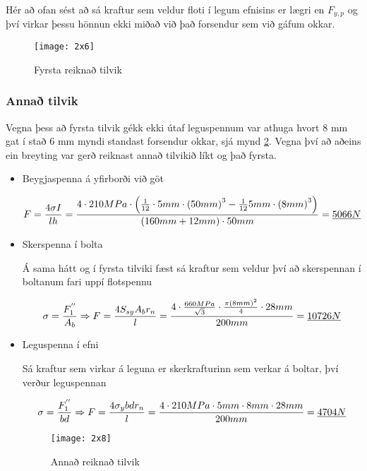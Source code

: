 Hér að ofan sést að sá kraftur sem veldur floti í legum efnisins er lægri en $F_{y,p}$ og því virkar þessu hönnun ekki miðað við það forsendur sem við gáfum okkar.

\begin{figure}
	\centering
	\texttt{[image: 2x6]}
	\caption{Fyrsta reiknað tilvik}
	\label{fig::2x6}
\end{figure}

\subsubsection{Annað tilvik}

Vegna þess að fyrsta tilvik gékk ekki útaf leguspennum var athuga hvort 8 mm gat í stað 6 mm myndi standast forsendur okkar, sjá mynd \ref{fig::2x8}. Vegna því að aðeins ein breyting var gerð reiknast annað tilvikið líkt og það fyrsta.

\begin{itemize}
	\item Beygjaspenna á yfirborði við göt
	
	\[
	F = \frac{4 \sigma I}{l h} = {4 \cdot 210 MPa \cdot  \left({1 \over 12} \cdot 5 mm \cdot \left(50mm\right)^3 - {1 \over 12} 5 mm \cdot \left(8mm\right)^3\right) \over (160 mm + 12 mm) \cdot 50 mm} = \underline{5066N}
	\] 
	
	\item Skerspenna í bolta
	
	Á sama hátt og í fyrsta tilviki fæst sá kraftur sem veldur því að skerspennan í boltanum fari uppí flotspennu
	
	\[
	\sigma = {F_1^{''} \over A_b} \Rightarrow F = {4 S_{sy} A_b r_n \over l} = {4 \cdot {660MPa \over \sqrt{3}} \cdot {\pi \left(8mm\right)^2 \over 4} \cdot 28 mm \over 200 mm} = \underline{10726N}
	\]
	
	\item Leguspenna í efni
	
	Sá kraftur sem virkar á leguna er skerkrafturinn sem verkar á boltar, því verður leguspennan
	
	\[
	\sigma = {F_1^{''} \over bd} \Rightarrow F = {4 \sigma_{y} b d r_n \over l} = {4 \cdot 210 MPa \cdot 5 mm \cdot 8 mm \cdot 28 mm \over 200mm} = \underline{4704N}
	\]

\begin{figure}
	\centering
	\texttt{[image: 2x8]}
	\caption{Annað reiknað tilvik}
	\label{fig::2x8}
\end{figure}

\end{itemize}


